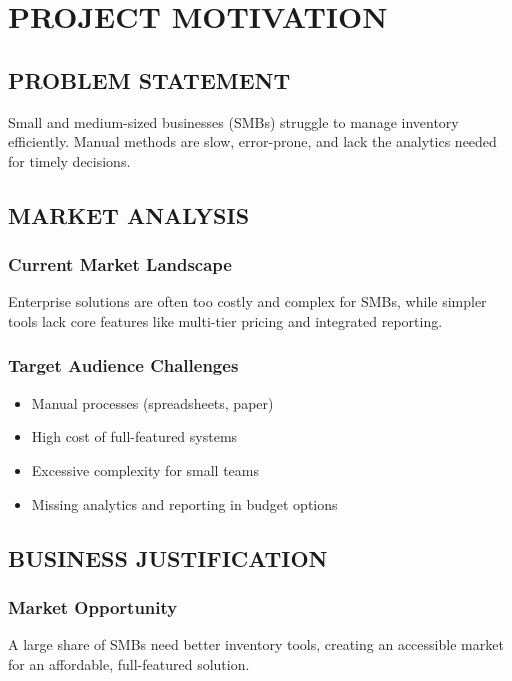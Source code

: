 
\chapter{PROJECT MOTIVATION}

\section{PROBLEM STATEMENT}

Small and medium-sized businesses (SMBs) struggle to manage inventory efficiently. Manual methods are slow, error-prone, and lack the analytics needed for timely decisions.

\section{MARKET ANALYSIS}

\subsection{Current Market Landscape}

Enterprise solutions are often too costly and complex for SMBs, while simpler tools lack core features like multi-tier pricing and integrated reporting.

\subsection{Target Audience Challenges}
\begin{itemize}
\item Manual processes (spreadsheets, paper)
\item High cost of full-featured systems
\item Excessive complexity for small teams
\item Missing analytics and reporting in budget options
\end{itemize}

\section{BUSINESS JUSTIFICATION}

\subsection{Market Opportunity}

A large share of SMBs need better inventory tools, creating an accessible market for an affordable, full-featured solution.

